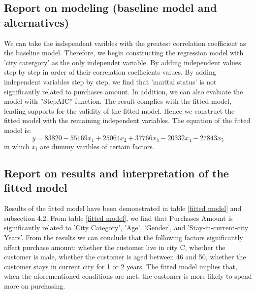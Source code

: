 \documentclass[12pt]{article}
\begin{document}
\subsection{Report on modeling (baseline model and alternatives)}
We can take the independent varibles with the greatest correlation coefficient as the baseline model. Therefore, we begin constructing the regression model with 'city catergory' as the only independet variable. By adding independent values step by step in order of their correlation coefficients values. By adding independent variables step by step, we find that 'marital status' is not significantly related to purchases amount.  In addition, we can also evaluate the model with ''StepAIC'' function. The result complies with the fitted model, lending supports for the validity of the fitted model. Hence we construct the fitted model with the remaining independent variables. The equation of the fitted model is:
\begin{equation}
	y = 83820 - 55169x_{1} + 25064x_{2} + 37766x_{3} - 20332x_{4} - 27843x_{5} 
\end{equation} 
in which $x_{i}$ are dummy varibles of certain factors. 
\subsection{Report on results and interpretation of the fitted model}
Results of the fitted model have been demonstrated in table \ref{fitted model} and subsection 4.2.  From table \ref{fitted model}, we find that Purchases Amount is significantly related to 'City Category', 'Age', 'Gender', and 'Stay-in-current-city Years'. From the results we can conclude that the following factors significantly affect purchase amount: whether the customer live in city C, whether the customer is male, whether the customer is aged between 46 and 50, whether the customer stays in current city for 1 or 2 years. The fitted model implies that, when the aforementioned conditions are met, the customer is more likely to spend more on purchasing.
\end{document}
